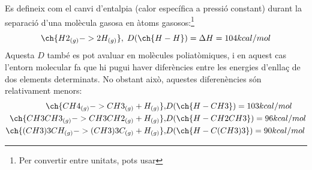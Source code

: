 Es defineix com el canvi d'entalpia (calor específica a pressió constant) durant la separació d'una molècula gasosa en àtoms gasosos:\footnote{Per convertir entre unitats, pots usar }
\[
\ch{H2_{(g)} -> 2 H_{(g)}}, \; D(\ch{H-H})=\Delta H = 104 kcal/mol
\]
Aquesta $D$ també es pot avaluar en molècules poliatòmiques, i en aquest cas l'entorn molecular fa que hi pugui haver diferències entre les energies d'enllaç de dos elements determinats. No obstant això, aquestes diferenències són relativament menors:
\begin{eqnarray}
\ch{CH4_{(g)} -> CH3_{(g)} + H_{(g)}}, & D(\ch{H-CH3})=103 kcal/mol\\
\ch{CH3CH3_{(g)} -> CH3CH2_{(g)} + H_{(g)}}, & D(\ch{H-CH2CH3})=96 kcal/mol\\
\ch{(CH3)3CH_{(g)} -> (CH3)3C_{(g)}+H_{(g)}}, & D(\ch{H-C(CH3)3})=90 kcal/mol
\end{eqnarray}

